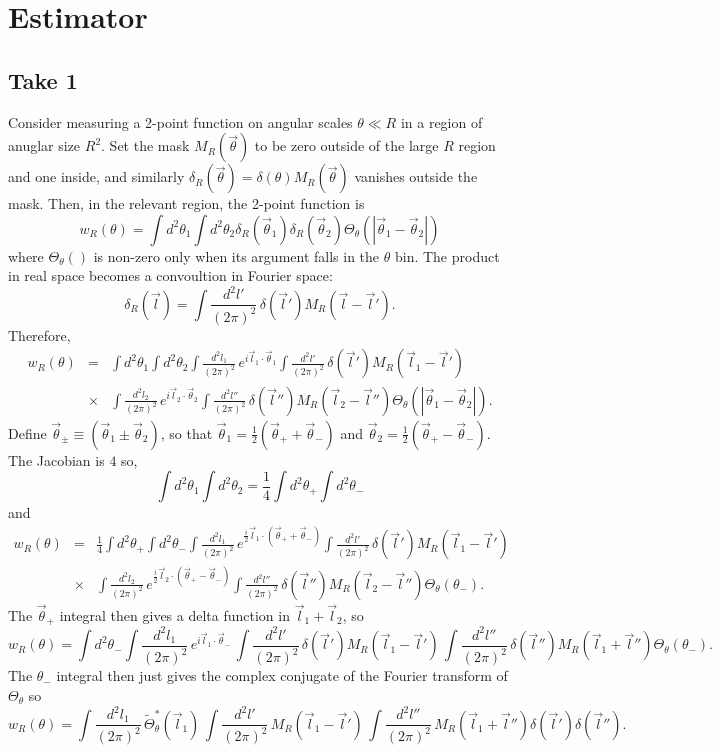 \documentclass[prd,amsmath,amssymb,floatfix,superscriptaddress,nofootinbib]{revtex4-1}
\def\be{\begin{equation}}
\def\ee{\end{equation}}
\def\bea{\begin{eqnarray}}
\def\eea{\end{eqnarray}}
\newcommand{\vs}{\nonumber\\}
\begin{document}
\maketitle
\section{Estimator}

\subsection{Take 1}
Consider measuring a 2-point function on angular scales $\theta\ll R$ in a region of anuglar size $R^2$. Set the mask $M_R(\vec\theta)$ to be zero outside of the large $R$ region and one inside, and similarly $\delta_R(\vec\theta) = \delta(\theta)M_R(\vec\theta)$ vanishes outside the mask. Then, in the relevant region, the 2-point function is
\be
w_R(\theta)= \int d^2\theta_1 \int d^2\theta_2 \delta_R(\vec\theta_1) \delta_R(\vec\theta_2) \Theta_\theta(|\vec\theta_1-\vec\theta_2|)
\ee
where $\Theta_\theta()$ is non-zero only when its argument falls in the $\theta$ bin.
The product in real space becomes a convoultion in Fourier space:
\be
\delta_R(\vec l) = \int \frac{d^2l'}{(2\pi)^2}\, \delta(\vec l') M_R(\vec l-\vec l') 
.\ee
Therefore,
\bea
w_R(\theta) &=& \int d^2\theta_1 \int d^2\theta_2 \int \frac{d^2l_1}{(2\pi)^2}\, e^{i\vec l_1\cdot \vec\theta_1}\int \frac{d^2l'}{(2\pi)^2}\, \delta(\vec l') M_R(\vec l_1-\vec l') 
\vs
&\times&
\int \frac{d^2l_2}{(2\pi)^2}\, e^{i\vec l_2\cdot \vec\theta_2}\int \frac{d^2l''}{(2\pi)^2}\, \delta(\vec l'') M_R(\vec l_2-\vec l'') 
 \Theta_\theta(|\vec\theta_1-\vec\theta_2|).
\eea
Define $\vec\theta_\pm \equiv (\vec\theta_1\pm\vec\theta_2)$, so that $\vec\theta_1=\frac12(\vec\theta_++\vec\theta_-)$ and $\vec\theta_2=\frac12(\vec\theta_+-\vec\theta_-)$. The Jacobian is $4$ so,
\be
 \int d^2\theta_1 \int d^2\theta_2  =  \frac14\int d^2\theta_+ \int d^2\theta_- 
\ee
and
\bea
w_R(\theta) &=& \frac14\int d^2\theta_+ \int d^2\theta_- \int \frac{d^2l_1}{(2\pi)^2}\, e^{\frac{i}2\vec l_1\cdot (\vec\theta_++\vec\theta_-)}\int \frac{d^2l'}{(2\pi)^2}\, \delta(\vec l') M_R(\vec l_1-\vec l') 
\vs
&\times&
\int \frac{d^2l_2}{(2\pi)^2}\, e^{\frac{i}2\vec l_2\cdot (\vec\theta_+-\vec\theta_-)}\int \frac{d^2l''}{(2\pi)^2}\, \delta(\vec l'') M_R(\vec l_2-\vec l'') 
 \Theta_\theta(\theta_-).
\eea
The $\vec\theta_+$ integral then gives a delta function in $\vec l_1+\vec l_2$, so
\be
w_R(\theta) =  \int d^2\theta_- \int \frac{d^2l_1}{(2\pi)^2}\, e^{i\vec l_1\cdot\vec\theta_-}\, \int \frac{d^2l'}{(2\pi)^2}\, \delta(\vec l') M_R(\vec l_1-\vec l') 
\,\int \frac{d^2l''}{(2\pi)^2}\, \delta(\vec l'') M_R(\vec l_1+\vec l'') 
 \Theta_\theta(\theta_-).
\ee
The $\theta_-$ integral then just gives the complex conjugate of the Fourier transform of $\Theta_\theta$ so
\be
w_R(\theta) =  \int \frac{d^2l_1}{(2\pi)^2}\, \tilde \Theta_\theta^*(\vec l_1)\, \int \frac{d^2l'}{(2\pi)^2}\, M_R(\vec l_1-\vec l') 
\,\int \frac{d^2l''}{(2\pi)^2}\, M_R(\vec l_1+\vec l'') \delta(\vec l') \delta(\vec l'') 
.
\ee
\end{document}
